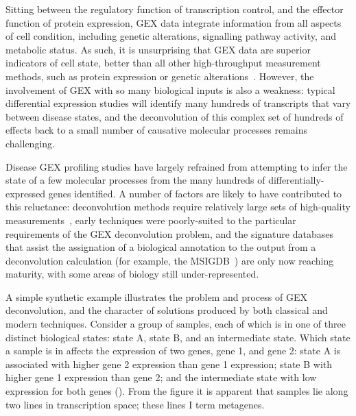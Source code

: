 \documentclass[dissertation.tex]{subfiles}
\begin{document}
Sitting between the regulatory function of transcription control, and the effector function of protein expression, \gls{GEX} data integrate information from all aspects of cell condition, including genetic alterations, signalling pathway activity, and metabolic status.  As such, it is unsurprising that \gls{GEX} data are superior indicators of cell state, better than all other high-throughput measurement methods, such as protein expression or genetic alterations~\cite{Ray2014}.  However, the involvement of \gls{GEX} with so many biological inputs is also a weakness: typical differential expression studies will identify many hundreds of transcripts that vary between disease states, and the deconvolution of this complex set of hundreds of effects back to a small number of causative molecular processes remains challenging.

Disease \gls{GEX} profiling studies have largely refrained from attempting to infer the state of a few molecular processes from the many hundreds of differentially-expressed genes identified.  A number of factors are likely to have contributed to this reluctance: deconvolution methods require relatively large sets of high-quality measurements~\cite{MacCallum1999}, early techniques were poorly-suited to the particular requirements of the \gls{GEX} deconvolution problem, and the signature databases that assist the assignation of a biological annotation to the output from a deconvolution calculation (for example, the \acrshort{MSIGDB}~\cite{Subramanian2005}) are only now reaching maturity, with some areas of biology still under-represented.

A simple synthetic example illustrates the problem and process of \gls{GEX} deconvolution, and the character of solutions produced by both classical and modern techniques.  Consider a group of samples, each of which is in one of three distinct biological states: state A, state B, and an intermediate state.  Which state a sample is in affects the expression of two genes, gene 1, and gene 2: state A is associated with higher gene 2 expression than gene 1 expression; state B with higher gene 1 expression than gene 2; and the intermediate state with low expression for both genes ().  From the figure it is apparent that samples lie along two lines in transcription space; these lines I term metagenes.
\end{document}
